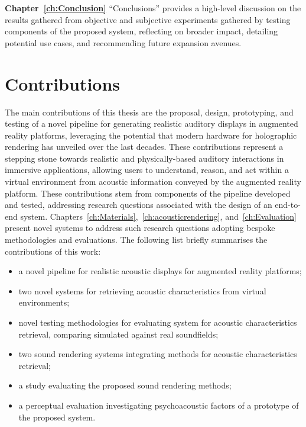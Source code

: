 \textbf{Chapter~\ref{ch:Conclusion}} ``Conclusions'' provides a high-level discussion on the results gathered from objective and subjective experiments gathered by testing components of the proposed system, reflecting on broader impact, detailing potential use cases, and recommending future expansion avenues.

\section{Contributions}
The main contributions of this thesis are the proposal, design, prototyping, and testing of a novel pipeline for generating realistic auditory displays in augmented reality platforms, leveraging the potential that modern hardware for holographic rendering has unveiled over the last decades. These contributions represent a stepping stone towards realistic and physically-based auditory interactions in immersive applications, allowing users to understand, reason, and act within a virtual environment from acoustic information conveyed by the augmented reality platform.
These contributions stem from components of the pipeline developed and tested, addressing research questions associated with the design of an end-to-end system. Chapters~\ref{ch:Materials},~\ref{ch:acousticrendering}, and~\ref{ch:Evaluation} present novel systems to address such research questions adopting bespoke methodologies and evaluations. The following list briefly summarises the contributions of this work:
\begin{itemize}
    \item a novel pipeline for realistic acoustic displays for augmented reality platforms;
    \item two novel systems for retrieving acoustic characteristics from virtual environments;
    \item novel testing methodologies for evaluating system for acoustic characteristics retrieval, comparing simulated against real soundfields;
    \item two sound rendering systems integrating methods for acoustic characteristics retrieval;
    \item a study evaluating the proposed sound rendering methods;
    \item a perceptual evaluation investigating psychoacoustic factors of a prototype of the proposed system.
\end{itemize}

